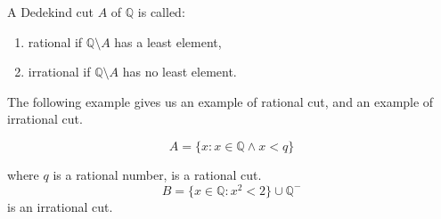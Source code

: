 \begin{definition}
    A Dedekind cut $A$ of $\mathbb{Q}$ is called:
    \begin{enumerate}[label={(\roman*)}]
        \item rational if $\mathbb{Q}\setminus A$ has a least element,
        \item irrational if $\mathbb{Q}\setminus A$ has no least element.
    \end{enumerate}
\end{definition}

The following example gives us an example of rational cut, and an example of irrational cut.

\begin{example}
    \[
        A = \{ x : x\in\mathbb{Q}\land x < q \}
    \]

    where $q$ is a rational number, is a rational cut.
    \[
        B = \{ x\in\mathbb{Q}: {x}^{2} < 2 \} \cup \mathbb{Q}^{-}
    \]
    is an irrational cut.
\end{example}

